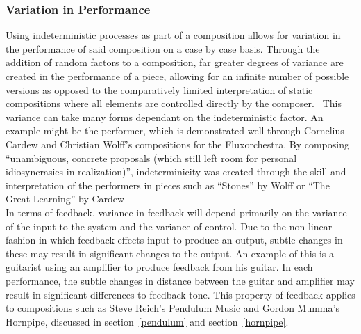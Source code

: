 \documentclass[titlepage]{scrartcl}
\begin{document}
    \subsubsection{Variation in Performance}\label{variance}
    Using indeterministic processes as part of a composition allows for
    variation in the performance of said composition on a case by case basis.
    Through the addition of random factors to a composition, far greater
    degrees of variance are created in the performance of a piece, allowing for
    an infinite number of possible versions as opposed to the comparatively
    limited interpretation of static compositions where all elements are
    controlled directly by the composer.~\parencite[p.97-98, 381]{jc2009co,
    holmes2012eaem}
    This variance can take many forms dependant on the indeterministic factor.
    An example might be the performer, which is demonstrated well through
    Cornelius Cardew and Christian Wolff's compositions for the Fluxorchestra.
    By composing ``unambiguous, concrete proposals (which still left room for
    personal idiosyncrasies in realization)'', indeterminicity was created
    through the skill and interpretation of the performers in pieces such as
    ``Stones'' by Wolff or ``The Great Learning'' by
    Cardew~\parencite[110]{nyman1999em}\\
    In terms of feedback, variance in feedback will depend primarily on the
    variance of the input to the system and the variance of control. Due to the
    non-linear fashion in which feedback effects input to produce an output,
    subtle changes in these may result in significant changes to the output. An
    example of this is a guitarist using an amplifier to produce feedback from
    his guitar. In each performance, the subtle changes in distance between the
    guitar and amplifier may result in significant differences to feedback
    tone. This property of feedback applies to compositions such as Steve
    Reich's Pendulum Music and Gordon Mumma's Hornpipe, discussed in
    section~\ref{pendulum} and section~\ref{hornpipe}.
\end{document}
